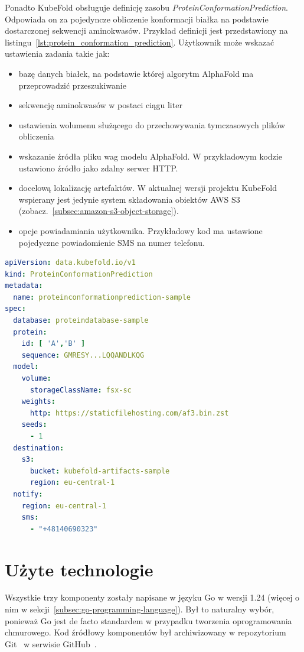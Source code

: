 Ponadto KubeFold obsługuje definicję zasobu \textit{ProteinConformationPrediction}.
Odpowiada on za pojedyncze obliczenie konformacji białka na podstawie dostarczonej sekwencji aminokwasów.
Przykład definicji jest przedstawiony na listingu~\ref{lst:protein_conformation_prediction}.
Użytkownik może wskazać ustawienia zadania takie jak:
\begin{itemize}
    \item bazę danych białek, na podstawie której algorytm AlphaFold ma przeprowadzić przeszukiwanie
    \item sekwencję aminokwasów w postaci ciągu liter
    \item ustawienia wolumenu służącego do przechowywania tymczasowych plików obliczenia
    \item wskazanie źródła pliku wag modelu AlphaFold.
    W przykładowym kodzie ustawiono źródło jako zdalny serwer HTTP.
    \item docelową lokalizację artefaktów.
    W aktualnej wersji projektu KubeFold wspierany jest jedynie system składowania obiektów AWS S3 (zobacz.~\ref{subsec:amazon-s3-object-storage}).
    \item opcje powiadamiania użytkownika.
    Przykładowy kod ma ustawione pojedyczne powiadomienie SMS na numer telefonu.
\end{itemize}

\begin{lstlisting}[language=yaml,caption={Przykładowy kod YAML zasobu ProteinConformationPrediction},label={lst:protein_conformation_prediction}]
apiVersion: data.kubefold.io/v1
kind: ProteinConformationPrediction
metadata:
  name: proteinconformationprediction-sample
spec:
  database: proteindatabase-sample
  protein:
    id: [ 'A','B' ]
    sequence: GMRESY...LQQANDLKQG
  model:
    volume:
      storageClassName: fsx-sc
    weights:
      http: https://staticfilehosting.com/af3.bin.zst
    seeds:
      - 1
  destination:
    s3:
      bucket: kubefold-artifacts-sample
      region: eu-central-1
  notify:
    region: eu-central-1
    sms:
      - "+48140690323"
\end{lstlisting}


\section{Użyte technologie}
Wszystkie trzy komponenty zostały napisane w języku Go w wersji 1.24 (więcej o nim w sekcji~\ref{subsec:go-programming-language}).
Był to naturalny wybór, ponieważ Go jest de facto standardem w przypadku tworzenia oprogramowania chmurowego.
Kod źródłowy komponentów był archiwizowany w repozytorium Git~\cite{git} w serwisie GitHub~\cite{github}.

